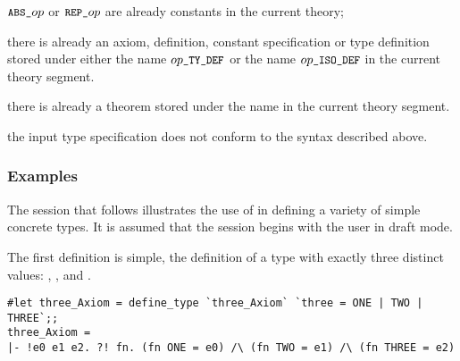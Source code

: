 {{\begin{myenumerate}
\item $\ml{ABS\_}\ty{op}$
 or $\ml{REP\_}\ty{op}$
 are already constants in the
current theory;

\item there is already an axiom, definition, constant specification or type
definition stored under either the name
$\ty{op}\ml{\_TY\_DEF}$ or the name
$\ty{op}\ml{\_ISO\_DEF}$ in the current
theory segment.

\item there is already a theorem stored under the name  in the
current theory segment.

\item the input type specification does not conform to the syntax described
above.

\end{myenumerate}

\subsubsection{Examples}\label{define-type-example}

The session that follows illustrates the use of  in defining
a variety of simple concrete types.  It is assumed that the session begins
with the user in draft mode.

The first definition is simple, the definition of a type  with
exactly three distinct values: , , and .

\setcounter{sessioncount}{1}\label{types-session}
\begin{session}\begin{verbatim}
#let three_Axiom = define_type `three_Axiom` `three = ONE | TWO | THREE`;;
three_Axiom = 
|- !e0 e1 e2. ?! fn. (fn ONE = e0) /\ (fn TWO = e1) /\ (fn THREE = e2)
\end{verbatim}\end{session}

}}
